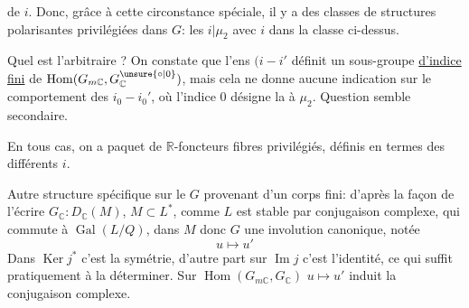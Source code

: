 de $i$. 
Donc, grâce à cette circonstance spéciale, il y a des classes de  structures polarisantes privilégiées dans $G$: les $i|\mu_2$ avec $i$ dans la classe ci-dessus.

Quel est l'arbitraire ? On constate que l'ens  $(i-i'$  définit un sous-groupe \uline{d'indice fini} de $\operatorname{Hom}(G_{m\mathbb C},G^{\unsure{\circ|0}}_{\mathbb C})$, mais cela ne donne aucune indication sur le comportement des $i_0-i_0'$, où l'indice $0$ désigne la  à $\mu_2$. Question semble secondaire.

En tous cas, on a   paquet de $\mathbb R$-foncteurs fibres privilégiés, définis en termes des différents $i$.


Autre structure spécifique sur le $G$ provenant d'un corps fini: d'après la façon de l'écrire $G_{\mathbb C}:D_{\mathbb C}(M)$, $M\subset L^*$, comme $L$ est stable par conjugaison complexe, qui commute à $\operatorname{Gal}(L/Q)$,  dans $M$ donc $G$ une involution canonique, notée
\[
u\longmapsto u'
\]
Dans $\operatorname{Ker}j^*$ c'est la symétrie, d'autre part sur $\operatorname{Im}j$ c'est l'identité, ce qui suffit pratiquement à la déterminer. Sur $\operatorname{Hom}(G_{m\mathbb C},G_{\mathbb C})$ $u\mapsto u'$ induit la conjugaison complexe.
